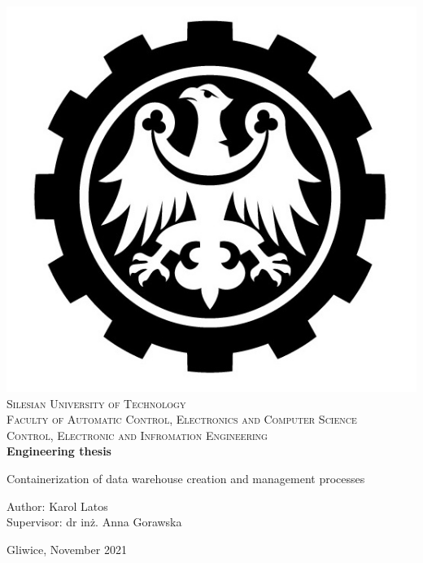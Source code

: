\newpage \vspace{-5cm}
\thispagestyle{empty}


\begin{onehalfspacing}
\begin{center}

\centering
\includegraphics[keepaspectratio, scale=0.5]{./figures/polsl_eng_notext.jpg} \\[.8cm]

{\fontsize{17.28}{16}\selectfont
\textsc{Silesian University of Technology\\[.3cm]
Faculty of Automatic Control, Electronics and Computer Science \\[.8cm]
Control, Electronic and Infromation Engineering \\[2.5cm]}
\textbf{Engineering thesis}\\[1.7cm]}

\large{Containerization of data warehouse creation and management processes} \\[2.4cm]

\large
\begin{flushleft}
Author: Karol Latos  \\
Supervisor: dr inż. Anna Gorawska \\
\end{flushleft}

\vspace{1.8cm}
Gliwice, November 2021
\end{center}
\end{onehalfspacing}


\newpage
\thispagestyle{empty}
\mbox{}
\clearpage

\setcounter{page}{0}
\tableofcontents

\pagestyle{fancy}
